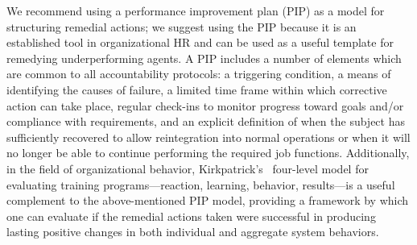 \documentclass[conference]{IEEEtran}
\begin{document}
We recommend using a performance improvement plan (PIP) as a model for
structuring remedial actions; we suggest using the PIP because it is an
established tool in organizational HR and can be used as a useful template for
remedying underperforming agents. A PIP includes a number of elements which are
common to all accountability protocols: a triggering condition, a means of
identifying the causes of failure, a limited time frame within which corrective
action can take place, regular check-ins to monitor progress toward goals and/or
compliance with requirements, and an explicit definition of when the subject has
sufficiently recovered to allow reintegration into normal operations or when it
will no longer be able to continue performing the required job functions.
Additionally, in the field of organizational behavior, Kirkpatrick's~\cite{kirkpatrick1994evaluating}
four-level model for evaluating training programs---reaction, learning,
behavior, results---is a useful complement to the above-mentioned PIP model,
providing a framework by which one can evaluate if the remedial actions taken
were successful in producing lasting positive changes in both individual and
aggregate system behaviors.
\end{document}
